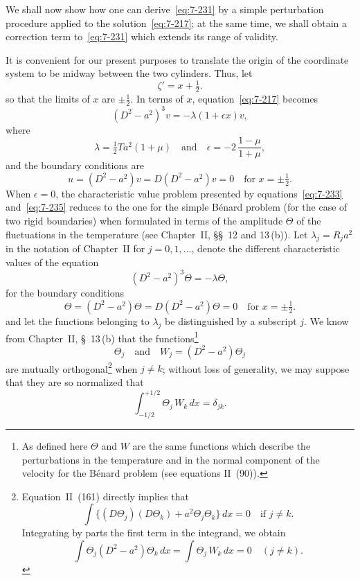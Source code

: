We shall now show how one can derive~\eqref{eq:7-231} by a simple perturbation
procedure applied to the solution~\eqref{eq:7-217}; at the same time, we
shall obtain a correction term to~\eqref{eq:7-231} which extends its range of validity.

It is convenient for our present purposes to translate the origin of the
coordinate system to be midway between the two cylinders.  Thus, let
\begin{equation}
\label{eq:7-232}
\zeta' = x + \tfrac{1}{2}.
\end{equation}
so that the limits of $x$ are $\pm\frac{1}{2}$.  In terms of $x$, equation~\eqref{eq:7-217} becomes
\begin{equation}
\label{eq:7-233}
(D^2-a^2)^3 v = -\lambda(1+\epsilon x)v,
\end{equation}
where
\begin{equation}
\label{eq:7-234}
\lambda = \tfrac{1}{2}Ta^2(1+\mu) \quad \text{and} \quad
\epsilon = -2\,\frac{1-\mu}{1+\mu},
\end{equation}
and the boundary conditions are
\begin{equation}
\label{eq:7-235}
u = (D^2-a^2)v = D(D^2-a^2)v = 0
\quad \text{for } x = \pm\tfrac{1}{2}.
\end{equation}
When $\epsilon = 0$, the characteristic value problem presented by equations~\eqref{eq:7-233} and~\eqref{eq:7-235} reduces to the one for the simple B\'enard problem (for
the case of two rigid boundaries) when formulated in terms of the
amplitude $\Theta$ of the fluctuations in the temperature (see Chapter~II,
\S\S~12 and 13\,(b)).  Let $\lambda_j = R_j a^2$ in the notation of Chapter~II for
$j = 0, 1, \ldots$, denote the different characteristic values of the equation
\begin{equation}
\label{eq:7-236}
(D^2-a^2)^3\Theta = -\lambda\Theta,
\end{equation}
for the boundary conditions
\begin{equation}
\label{eq:7-237}
\Theta = (D^2-a^2)\Theta = D(D^2-a^2)\Theta = 0
\quad \text{for } x = \pm\tfrac{1}{2}.
\end{equation}
and let the functions belonging to $\lambda_j$ be distinguished by a subscript $j$.
We know from Chapter~II, \S~13\,(b) that the functions\footnote{As defined here $\Theta$ and $W$ are the same functions which describe the perturbations
in the temperature and in the normal component of the velocity for the B\'enard problem
(see equations II~(90)).}
\begin{equation}
\label{eq:7-238}
\Theta_j \quad \text{and} \quad W_j = (D^2-a^2)\Theta_j
\end{equation}
are mutually orthogonal\footnote{Equation~II~(161) directly implies that
\[
\int \{(D\Theta_j)(D\Theta_k)+a^2\Theta_j\Theta_k\}\,dx = 0 \quad \text{if } j \neq k.
\]
Integrating by parts the first term in the integrand, we obtain
\[
\int \Theta_j(D^2-a^2)\Theta_k\,dx = \int \Theta_j\,W_k\,dx = 0 \quad (j \neq k).
\]}
when $j \neq k$; without loss of generality, we
may suppose that they are so normalized that
\begin{equation}
\label{eq:7-239}
\int_{-1/2}^{+1/2}\Theta_j\, W_k\, dx = \delta_{jk}.
\end{equation}

